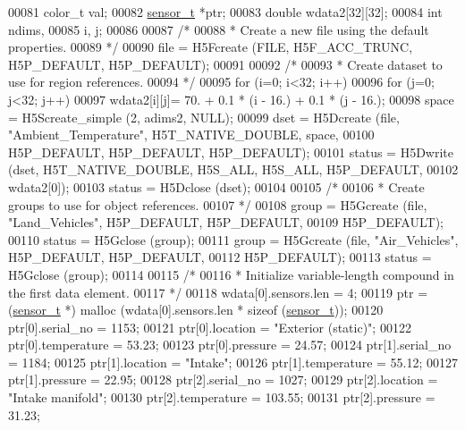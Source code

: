 \begin{DoxyCode}
00081     color\_t     val;
00082     \hyperlink{structsensor__t}{sensor\_t}    *ptr;
00083     \textcolor{keywordtype}{double}      wdata2[32][32];
00084     \textcolor{keywordtype}{int}         ndims,
00085                 i, j;
00086 
00087     \textcolor{comment}{/*}
00088 \textcolor{comment}{     * Create a new file using the default properties.}
00089 \textcolor{comment}{     */}
00090     file = H5Fcreate (FILE, H5F\_ACC\_TRUNC, H5P\_DEFAULT, H5P\_DEFAULT);
00091 
00092     \textcolor{comment}{/*}
00093 \textcolor{comment}{     * Create dataset to use for region references.}
00094 \textcolor{comment}{     */}
00095     \textcolor{keywordflow}{for} (i=0; i<32; i++)
00096         \textcolor{keywordflow}{for} (j=0; j<32; j++)
00097             wdata2[i][j]= 70. + 0.1 * (i - 16.) + 0.1 * (j - 16.);
00098     space = H5Screate\_simple (2, adims2, NULL);
00099     dset = H5Dcreate (file, \textcolor{stringliteral}{"Ambient\_Temperature"}, H5T\_NATIVE\_DOUBLE, space,
00100                 H5P\_DEFAULT, H5P\_DEFAULT, H5P\_DEFAULT);
00101     status = H5Dwrite (dset, H5T\_NATIVE\_DOUBLE, H5S\_ALL, H5S\_ALL, H5P\_DEFAULT,
00102                 wdata2[0]);
00103     status = H5Dclose (dset);
00104 
00105     \textcolor{comment}{/*}
00106 \textcolor{comment}{     * Create groups to use for object references.}
00107 \textcolor{comment}{     */}
00108     group = H5Gcreate (file, \textcolor{stringliteral}{"Land\_Vehicles"}, H5P\_DEFAULT, H5P\_DEFAULT,
00109                 H5P\_DEFAULT);
00110     status = H5Gclose (group);
00111     group = H5Gcreate (file, \textcolor{stringliteral}{"Air\_Vehicles"}, H5P\_DEFAULT, H5P\_DEFAULT,
00112                 H5P\_DEFAULT);
00113     status = H5Gclose (group);
00114 
00115     \textcolor{comment}{/*}
00116 \textcolor{comment}{     * Initialize variable-length compound in the first data element.}
00117 \textcolor{comment}{     */}
00118     wdata[0].sensors.len = 4;
00119     ptr = (\hyperlink{structsensor__t}{sensor\_t} *) malloc (wdata[0].sensors.len * sizeof (\hyperlink{structsensor__t}{sensor\_t}));
00120     ptr[0].serial\_no = 1153;
00121     ptr[0].location = \textcolor{stringliteral}{"Exterior (static)"};
00122     ptr[0].temperature = 53.23;
00123     ptr[0].pressure = 24.57;
00124     ptr[1].serial\_no = 1184;
00125     ptr[1].location = \textcolor{stringliteral}{"Intake"};
00126     ptr[1].temperature = 55.12;
00127     ptr[1].pressure = 22.95;
00128     ptr[2].serial\_no = 1027;
00129     ptr[2].location = \textcolor{stringliteral}{"Intake manifold"};
00130     ptr[2].temperature = 103.55;
00131     ptr[2].pressure = 31.23;

\end{DoxyCode}
